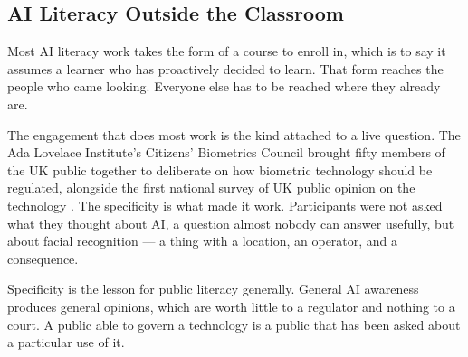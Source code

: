 \subsection{AI Literacy Outside the Classroom}
\label{sec:8.2.2}
Most AI literacy work takes the form of a course to enroll in, which is to say it assumes a learner who has proactively decided to learn. That form reaches the people who came looking. Everyone else has to be reached where they already are.

The engagement that does most work is the kind attached to a live question. The Ada Lovelace Institute's Citizens' Biometrics Council brought fifty members of the UK public together to deliberate on how biometric technology should be regulated, alongside the first national survey of UK public opinion on the technology \autocite{adalovelaceinstitute2021biometrics}. The specificity is what made it work. Participants were not asked what they thought about AI, a question almost nobody can answer usefully, but about facial recognition — a thing with a location, an operator, and a consequence.

Specificity is the lesson for public literacy generally. General AI awareness produces general opinions, which are worth little to a regulator and nothing to a court. A public able to govern a technology is a public that has been asked about a particular use of it.
